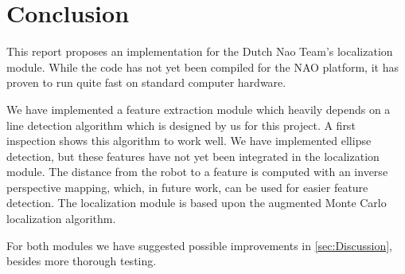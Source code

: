 \documentclass[	DIV=calc,%
							paper=a4,%
							fontsize=9pt,%
							twocolumn]{scrartcl}	 					%
\begin{document}
\section{Conclusion}
\label{sec:Conclusion}
This report proposes an implementation for the Dutch Nao Team's localization module. While the code has not yet been compiled for the NAO platform, it has proven to run quite fast on standard computer hardware. 

We have implemented a feature extraction module which heavily depends on a line detection algorithm which is designed by us for this project.  A first inspection shows this algorithm to work well.  We have implemented ellipse detection, but these features have not yet been integrated in the localization module.  The distance from the robot to a feature is computed with an inverse perspective mapping, which, in future work, can be used for easier feature detection.  The localization module is based upon the augmented Monte Carlo localization algorithm.

For both modules we have suggested possible improvements in \ref{sec:Discussion}, besides more thorough testing.

\printbibliography
\end{document}
